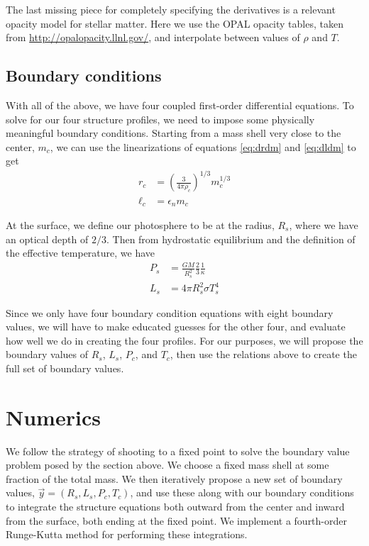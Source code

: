 \documentclass[onecolumn]{article}
\begin{document}
The last missing piece for completely specifying the derivatives is a relevant opacity model for stellar matter.  Here we use the OPAL opacity tables, taken from \url{http://opalopacity.llnl.gov/}, and interpolate between values of $\rho$ and $T$.

\subsection{Boundary conditions}
With all of the above, we have four coupled first-order differential equations.  To solve for our four structure profiles, we need to impose some physically meaningful boundary conditions.  Starting from a mass shell very close to the center, $m_c$, we can use the linearizations of equations \ref{eq:drdm} and \ref{eq:dldm} to get
\begin{align}
  r_c &= \left(\frac{3}{4\pi \rho_c}\right)^{1/3} m_c^{1/3} \\
  \ell_c &= \epsilon_n m_c \nonumber
\end{align}

At the surface, we define our photosphere to be at the radius, $R_s$, where we have an optical depth of $2 / 3$.  Then from hydrostatic equilibrium and the definition of the effective temperature, we have
\begin{align}
  P_s &= \frac{GM}{R_s^2}\frac{2}{3}\frac{1}{\kappa} \\
  L_s &= 4\pi R_s^2 \sigma T_s^4 \nonumber
\end{align}

Since we only have four boundary condition equations with eight boundary values, we will have to make educated guesses for the other four, and evaluate how well we do in creating the four profiles.  For our purposes, we will propose the boundary values of $R_s$, $L_s$, $P_c$, and $T_c$, then use the relations above to create the full set of boundary values.

\section{Numerics}

We follow the strategy of shooting to a fixed point to solve the boundary value problem posed by the section above.  We choose a fixed mass shell at some fraction of the total mass.  We then iteratively propose a new set of boundary values, $\vec{y} = (R_s, L_s, P_c, T_c)$, and use these along with our boundary conditions to integrate the structure equations both outward from the center and inward from the surface, both ending at the fixed point.  We implement a fourth-order Runge-Kutta method for performing these integrations.
\end{document}
